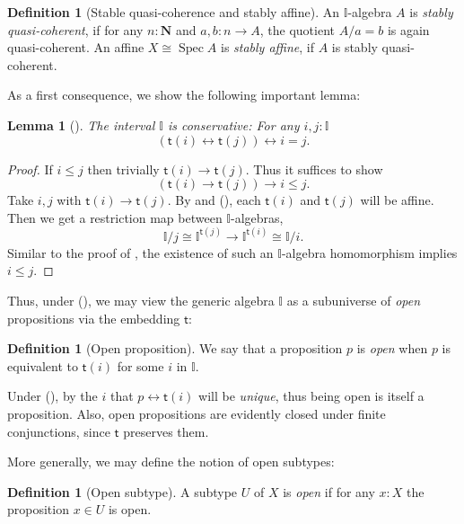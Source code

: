 \documentclass[a4paper,12pt]{amsart}
\newtheorem{lemma}[theorem]{Lemma}
\theoremstyle{definition}
\newtheorem{definition}[theorem]{Definition}
\newcommand{\mb}[1]{\mathbf{#1}}
\newcommand{\mbb}[1]{\mathbb{#1}}
\newcommand{\I}{\mbb I}
\newcommand{\ms}[1]{\mathsf{#1}}
\newcommand{\N}{\mb N}
\newcommand{\eq}{\leftrightarrow}
\newcommand{\spec}{\operatorname{Spec}}
\newcommand\istsym{\ms{t}}
\newcommand\ist[1]{\istsym(#1)}
\begin{document}
\begin{definition}[Stable quasi-coherence and stably affine]
  An $\I$-algebra $A$ is \emph{stably quasi-coherent}, if for any $n : \N$ and $a,b \colon n \to A$, the quotient $A/a=b$ is again quasi-coherent. An affine $X \cong \spec A$ is \emph{stably affine}, if $A$ is stably quasi-coherent.
\end{definition}

\PrintAxiomSQCI

As a first consequence, we show the following important lemma:

\begin{lemma}[\AxiomSQCI]\label{lem:intconserve}
  The interval $\I$ is \emph{conservative}: For any $i,j : \I$
  \[ (\ist{i} \eq \ist{j}) \eq i = j\text{.} \]
\end{lemma}
\begin{proof}
  If $i \le j$ then trivially $\ist{i} \to \ist{j}$. Thus it suffices to show
  \[ (\ist{i} \to \ist{j}) \to i \le j\text{.} \]
  Take $i,j$ with $\ist{i} \to \ist{j}$. By  and (\AxiomSQCI), each $\ist{i}$ and $\ist{j}$ will be affine. Then we get a restriction map between $\I$-algebras,
  \[ \I/j \cong \I^{\ist{j}} \to \I^{\ist{i}} \cong \I/i\text{.} \]
  Similar to the proof of , the existence of such an $\I$-algebra homomorphism implies $i \le j$. 
\end{proof}

Thus, under (\AxiomSQCI), we may view the generic algebra $\I$ as a subuniverse of \emph{open} propositions via the embedding $\istsym$:

\begin{definition}[Open proposition]
  We say that a proposition $p$ is \emph{open} when $p$ is equivalent to $\ist{i}$ for some $i$ in $\I$.
\end{definition}

Under (\AxiomSQCI), by  the $i$ that $p \eq \ist{i}$ will be \emph{unique}, thus being open is itself a proposition. Also, open propositions are evidently closed under finite conjunctions, since $\istsym$ preserves them. 

More generally, we may define the notion of open subtypes:

\begin{definition}[Open subtype]
  A subtype $U$ of $X$ is \emph{open} if for any $x:X$ the proposition $x\in U$ is open.
\end{definition}
\end{document}
